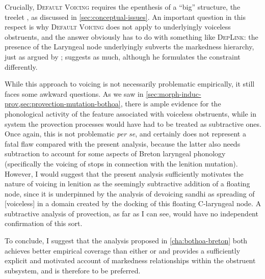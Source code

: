 Crucially, \textsc{Default Voicing} requires the epenthesis of a \enquote{big} structure, \ie the treelet , as discussed in \cref{sec:conceptual-issues}. An important question in this respect is why \textsc{Default Voicing} does not apply to underlyingly voiceless obstruents, and the answer obviously has to do with something like \textsc{DepLink}: the presence of the Laryngeal node underlyingly subverts the markedness hierarchy, just as argued by \citet{moren01:_distin}; \citet{hall09:_laryn_breton} suggests as much, although he formulates the constraint differently.

While this approach to voicing is not necessarily problematic empirically, it still faces some awkward questions. As we saw in \cref{sec:morph-induc-prov,sec:provection-mutation-bothoa}, there is ample evidence for the phonological activity of the feature associated with voiceless obstruents, while in  system the provection processes would have had to be treated as subtractive ones. Once again, this is not problematic \emph{per se}, and certainly does not represent a fatal flaw compared with the present analysis, because the latter also needs subtraction to account for some aspects of Breton laryngeal phonology (specifically the voicing of stops in connection with the lenition mutation). However, I would suggest that the present analysis sufficiently motivates the nature of voicing in lenition as the seemingly subtractive addition of a floating node, since it is underpinned by the analysis of devoicing sandhi as spreading of [voiceless] in a domain created by the docking of this floating C-laryngeal node. A subtractive analysis of provection, as far as I can see, would have no independent confirmation of this sort.

To conclude, I suggest that the analysis proposed in \cref{cha:bothoa-breton} both achieves better empirical coverage than either  or  and provides a sufficiently explicit and motivated account of markedness relationships within the obstruent subsystem, and is therefore to be preferred.


